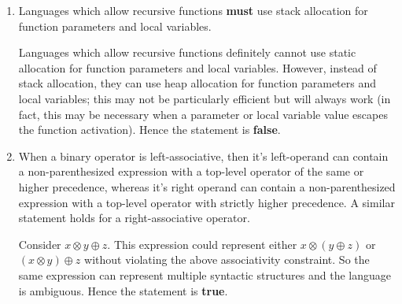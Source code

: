 \documentclass[12pt]{article}
\begin{document}
\begin{enumerate}
\begin{enumerate}
  \item Languages which allow recursive functions \textbf{must} use
    stack allocation for function parameters and local variables.

    Languages which allow recursive functions definitely cannot use
    static allocation for function parameters and local
    variables. However, instead of stack allocation, they can use heap
    allocation for function parameters and local variables; this may
    not be particularly efficient but will always work (in fact, this
    may be necessary when a parameter or local variable value escapes
    the function activation).  Hence the statement is \textbf{false}.

  \item When a binary operator is left-associative, then it's
    left-operand can contain a non-parenthesized expression with a
    top-level operator of the same or higher precedence, whereas it's
    right operand can contain a non-parenthesized expression with a
    top-level operator with strictly higher precedence.  A similar
    statement holds for a right-associative operator.

    Consider $x \otimes y \oplus z$.  This expression could represent
    either $x \otimes (y \oplus z)$ or $(x \otimes y) \oplus z$ without
    violating the above associativity constraint.  So the same expression
    can represent multiple syntactic structures and the language is
    ambiguous.  Hence the statement is \textbf{true}.

    \end{enumerate}

\end{enumerate}
\end{document}
